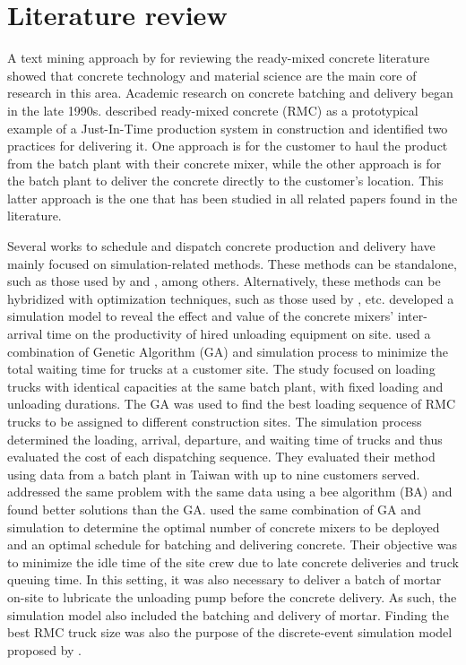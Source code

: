 \documentclass{article}
\begin{document}
\section{Literature review}
\label{lit_review}

A text mining approach by \cite{maghrebi2015text} for reviewing the ready-mixed concrete literature showed that concrete technology and material science are the main core of research in this area. Academic research on concrete batching and delivery began in the late 1990s. \cite{tommelein1999just} described ready-mixed concrete (RMC) as a prototypical example of a Just-In-Time production system in construction and identified two practices for delivering it. One approach is for the customer to haul the product from the batch plant with their concrete mixer, while the other approach is for the batch plant to deliver the concrete directly to the customer's location. This latter approach is the one that has been studied in all related papers found in the literature.

Several works to schedule and dispatch concrete production and delivery have mainly focused on simulation-related methods. These methods can be standalone, such as those used by \cite{zayed2001simulation, wang2001scheduling, tian_simulation_based_2010, panas_simulation_based_2013} and \cite{galic2016simulation}, among others. Alternatively, these methods can be hybridized with optimization techniques, such as those used by \cite{feng2004optimizing, lu2005optimized, feng_integrating_2006}, etc. \cite{wang2001scheduling} developed a simulation model to reveal the effect and value of the concrete mixers' inter-arrival time on the productivity of hired unloading equipment on site. \cite{feng2004optimizing} used a combination of Genetic Algorithm (GA) and simulation process to minimize the total waiting time for trucks at a customer site. The study focused on loading trucks with identical capacities at the same batch plant, with fixed loading and unloading durations. The GA was used to find the best loading sequence of RMC trucks to be assigned to different construction sites. The simulation process determined the loading, arrival, departure, and waiting time of trucks and thus evaluated the cost of each dispatching sequence. They evaluated their method using data from a batch plant in Taiwan with up to nine customers served. \cite{mayteekrieangkrai2015optimized} addressed the same problem with the same data using a bee algorithm (BA) and found better solutions than the GA. \cite{lu2005optimized} used the same combination of GA and simulation to determine the optimal number of concrete mixers to be deployed and an optimal schedule for batching and delivering concrete. Their objective was to minimize the idle time of the site crew due to late concrete deliveries and truck queuing time. In this setting, it was also necessary to deliver a batch of mortar on-site to lubricate the unloading pump before the concrete delivery. As such, the simulation model also included the batching and delivery of mortar. Finding the best RMC truck size was also the purpose of the discrete-event simulation model proposed by \cite{panas_simulation_based_2013}.
\end{document}
